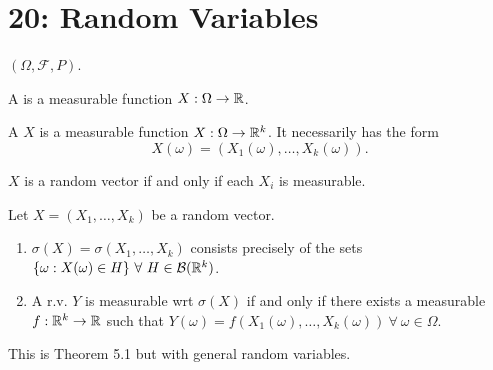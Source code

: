 \documentclass[class=article,crop=false]{standalone}
\begin{document}
\section*{20: Random Variables}

$ (\Omega,\mathcal{F},P)$.

\begin{defn}
A  is a measurable function $ X: \Omega \to \mathbb{R}$. 
\end{defn}

\begin{defn}
A  $ X$ is a measurable function $ X: \Omega \to \mathbb{R}^{k}$. It necessarily has the form
\[
	X(\omega)=(X_1(\omega),\ldots,X_k(\omega))
.\] 
\end{defn}

\begin{claim}
$ X$ is a random vector if and only if each  $ X_i$ is measurable.
\end{claim}

\begin{thm}[20.1]
	Let $ X=(X_1,\ldots,X_k)$ be a random vector.
	\begin{enumerate}[label=(\roman*)]
		\item $ \sigma(X) = \sigma(X_1,\ldots,X_k)$ consists precisely of the sets $ \{\omega: X(\omega) \in H\} \ \forall \ H \in \mathcal{B}(\mathbb{R}^{k})$.
		\item A r.v. $ Y$ is measurable wrt  $ \sigma(X)$ if and only if there exists a measurable $ f: \mathbb{R}^{k} \to \mathbb{R}$ such that $ Y(\omega) = f(X_1(\omega),\ldots,X_k(\omega)) \ \forall \ \omega \in \Omega$. 
	\end{enumerate}
\end{thm}

\begin{note}
This is Theorem 5.1 but with general random variables.
\end{note}
\end{document}
